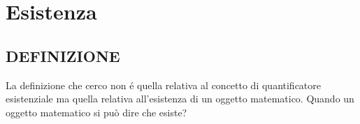 \chapter{Esistenza}

\section{DEFINIZIONE}
La definizione che cerco non \'{e} quella relativa al concetto di quantificatore esistenziale ma quella relativa all'esistenza di un oggetto matematico.
Quando un oggetto matematico si può dire che esiste?